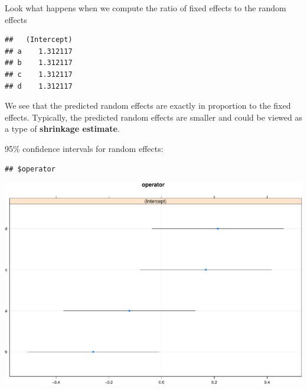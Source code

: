 \documentclass[
  ignorenonframetext,
]{beamer}
\newenvironment{Shaded}{\begin{snugshade}}{\end{snugshade}}
\newcommand{\DecValTok}[1]{\textcolor[rgb]{0.00,0.00,0.81}{#1}}
\newcommand{\DocumentationTok}[1]{\textcolor[rgb]{0.56,0.35,0.01}{\textbf{\textit{#1}}}}
\newcommand{\FunctionTok}[1]{\textcolor[rgb]{0.00,0.00,0.00}{#1}}
\newcommand{\NormalTok}[1]{#1}
\newcommand{\SpecialCharTok}[1]{\textcolor[rgb]{0.00,0.00,0.00}{#1}}
\begin{document}
\begin{frame}[fragile]{}
\protect\hypertarget{section-9}{}
Look what happens when we compute the ratio of fixed effects to the
random effects

\vspace{12pt}

\begin{Shaded}
\end{Shaded}

\begin{verbatim}
##   (Intercept)
## a    1.312117
## b    1.312117
## c    1.312117
## d    1.312117
\end{verbatim}

\vspace{12pt}

We see that the predicted random effects are exactly in proportion to
the fixed effects. Typically, the predicted random effects are smaller
and could be viewed as a type of \textbf{shrinkage estimate}.
\end{frame}

\begin{frame}[fragile]{}
\protect\hypertarget{section-10}{}
95\% confidence intervals for random effects:

\vspace{12pt}
\tiny

\begin{verbatim}
## $operator
\end{verbatim}

\includegraphics{week11p1_files/figure-beamer/95CI-1.pdf}
\end{frame}
\end{document}
